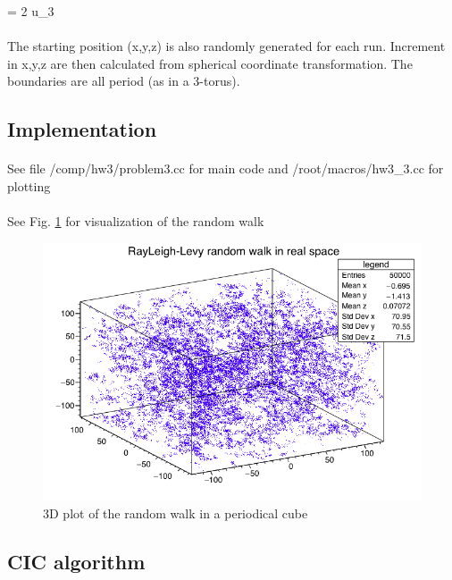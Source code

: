 \beq  \phi = 2 \Pi u_3 \eeq

\paragraph{}
The starting position (x,y,z) is also randomly generated for each run. Increment in x,y,z are then calculated from spherical coordinate transformation. The boundaries are all period (as in a 3-torus).



\subsection{Implementation}
\paragraph{}
See file /comp/hw3/problem3.cc for main code and /root/macros/hw3\_3.cc for plotting
\paragraph{}
See Fig. \ref{walk} for visualization of the random walk

\begin{figure}[!htbp]
  \centering
  \includegraphics[width=1\linewidth]{walk5000blue}
  \caption{3D plot of the random walk in a periodical cube}
  \label{walk}
\end{figure}
\FloatBarrier


\subsection{CIC algorithm}
